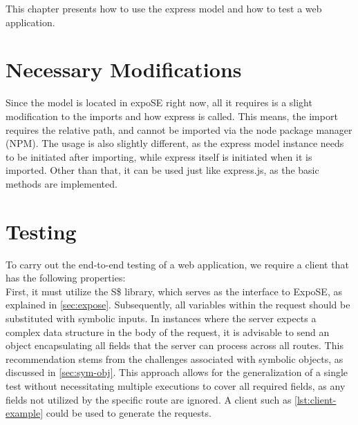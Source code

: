 This chapter presents how to use the express model and how to test a web application. 

\section{Necessary Modifications} 
\label{sec:nec-mods}

Since the model is located in expoSE right now, all it requires is a slight modification to the imports and how express is called.
This means, the import requires the relative path, and cannot be imported via the node package manager (NPM). 
The usage is also slightly different, as the express model instance needs to be initiated after importing, while express itself is initiated when it is imported. 
Other than that, it can be used just like express.js, as the basic methods are implemented.





\section{Testing} 
\label{sec:app-testing}
To carry out the end-to-end testing of a web application, we require a client that has the following properties:\\ 
First, it must utilize the S\$ library, which serves as the interface to ExpoSE, as explained in \autoref{sec:expose}. 
Subsequently, all variables within the request should be substituted with symbolic inputs. 
In instances where the server expects a complex data structure in the body of the request,
it is advisable to send an object encapsulating all fields that the server can process across all routes.
This recommendation stems from the challenges associated with symbolic objects, as discussed in \autoref{sec:sym-obj}. 
This approach allows for the generalization of a single test without necessitating multiple executions to cover all required fields,
as any fields not utilized by the specific route are ignored. 
A client such as  \autoref{lst:client-example} could be used to generate the requests.

